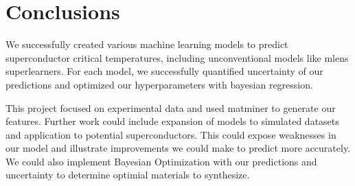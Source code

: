 \documentclass[twocolumn, nofootinbib, secnumarabic, amssymb, nobibnotes, aps, prd]{revtex4-2}
\begin{document}
\section{Conclusions} %
We successfully created various machine learning models to predict superconductor critical temperatures, including unconventional models like mlens superlearners. For each model, we successfully quantified uncertainty of our predictions and optimized our hyperparameters with bayesian regression. 

This project focused on experimental data and used matminer to generate our features. Further work could include expansion of models to simulated datasets and application to potential superconductors. This could expose weaknesses in our model and illustrate improvements we could make to predict more accurately. We could also implement Bayesian Optimization with our predictions and uncertainty to determine optimial materials to synthesize.
\end{document}
